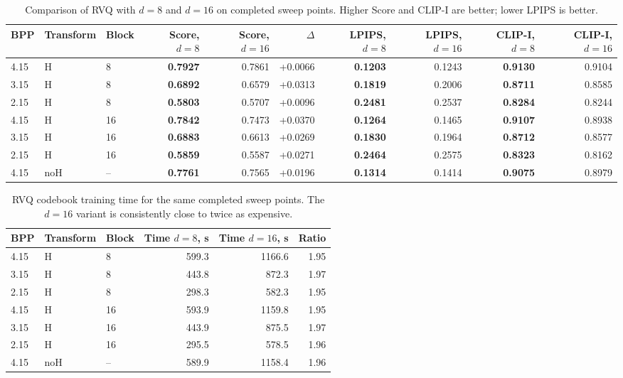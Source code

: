 
\begin{table}[t]
\centering
\small
\caption{Comparison of RVQ with $d=8$ and $d=16$ on completed sweep points. Higher Score and CLIP-I are better; lower LPIPS is better.}
\label{tab:rvq_d8_d16_quality}
\begin{tabular}{lllrrrrrrr}
\hline
BPP & Transform & Block & Score, $d=8$ & Score, $d=16$ & $\Delta$ & LPIPS, $d=8$ & LPIPS, $d=16$ & CLIP-I, $d=8$ & CLIP-I, $d=16$ \\
\hline
4.15 & H  & 8  & \textbf{0.7927} & 0.7861 & +0.0066 & \textbf{0.1203} & 0.1243 & \textbf{0.9130} & 0.9104 \\
3.15 & H  & 8  & \textbf{0.6892} & 0.6579 & +0.0313 & \textbf{0.1819} & 0.2006 & \textbf{0.8711} & 0.8585 \\
2.15 & H  & 8  & \textbf{0.5803} & 0.5707 & +0.0096 & \textbf{0.2481} & 0.2537 & \textbf{0.8284} & 0.8244 \\
4.15 & H  & 16 & \textbf{0.7842} & 0.7473 & +0.0370 & \textbf{0.1264} & 0.1465 & \textbf{0.9107} & 0.8938 \\
3.15 & H  & 16 & \textbf{0.6883} & 0.6613 & +0.0269 & \textbf{0.1830} & 0.1964 & \textbf{0.8712} & 0.8577 \\
2.15 & H  & 16 & \textbf{0.5859} & 0.5587 & +0.0271 & \textbf{0.2464} & 0.2575 & \textbf{0.8323} & 0.8162 \\
4.15 & noH & -- & \textbf{0.7761} & 0.7565 & +0.0196 & \textbf{0.1314} & 0.1414 & \textbf{0.9075} & 0.8979 \\
\hline
\end{tabular}
\end{table}

\begin{table}[t]
\centering
\small
\caption{RVQ codebook training time for the same completed sweep points. The $d=16$ variant is consistently close to twice as expensive.}
\label{tab:rvq_d8_d16_time}
\begin{tabular}{lllrrr}
\hline
BPP & Transform & Block & Time $d=8$, s & Time $d=16$, s & Ratio \\
\hline
4.15 & H  & 8  & 599.3 & 1166.6 & 1.95 \\
3.15 & H  & 8  & 443.8 & 872.3  & 1.97 \\
2.15 & H  & 8  & 298.3 & 582.3  & 1.95 \\
4.15 & H  & 16 & 593.9 & 1159.8 & 1.95 \\
3.15 & H  & 16 & 443.9 & 875.5  & 1.97 \\
2.15 & H  & 16 & 295.5 & 578.5  & 1.96 \\
4.15 & noH & -- & 589.9 & 1158.4 & 1.96 \\
\hline
\end{tabular}
\end{table}
